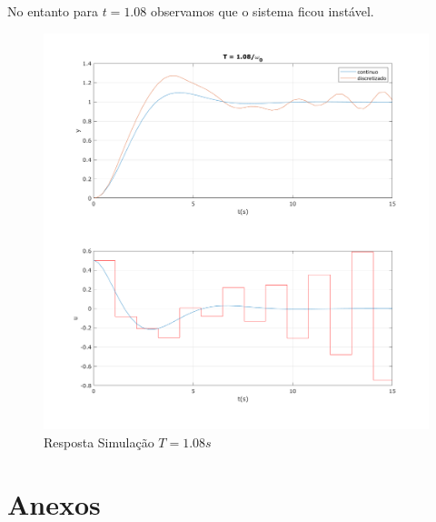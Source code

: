 \documentclass[a4paper,11pt]{article}
\begin{document}
No entanto para $t=1.08$ observamos que o sistema ficou instável.

\begin{figure}[H]
    \centering
    \includegraphics[width=0.9\linewidth]{img/exsim2-plot-sim-t108.png}
    \caption{Resposta Simulação $T=1.08s$}
\end{figure}




\nocite{sympy}
\nocite{pythontex}
\nocite{matlabcontrol}
\nocite{matlabsymbolic}

\newpage
\section*{Anexos}
\end{document}
